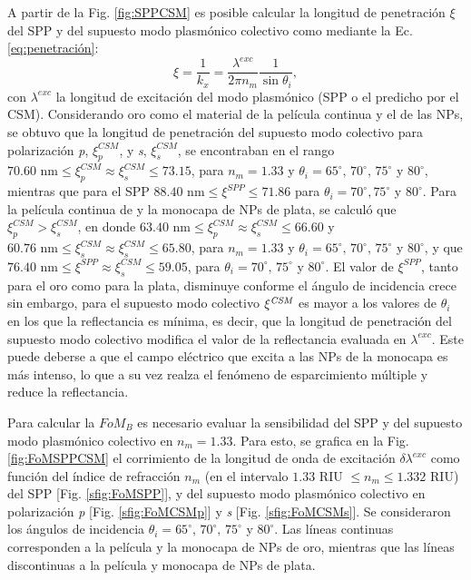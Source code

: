 A partir de la  Fig. \ref{fig:SPPCSM} es posible calcular la longitud de penetración $\xi$ del SPP y del supuesto modo plasmónico colectivo como mediante la Ec. \eqref{eq:penetración}:
%
\begin{equation*}
\xi=\frac{1}{k_x}= \frac{\lambda^{exc}}{2\pi n_m}\frac{1}{\sin\theta_i} ,
\end{equation*}
%
con $\lambda^{exc}$ la longitud de excitación del modo plasmónico (SPP o el predicho por el CSM). Considerando oro como el material de la película continua y el de las NPs, se obtuvo que la longitud de penetración del supuesto modo colectivo para polarización \emph{p}, $\xi^{\textit{CSM}}_p$, y \emph{s}, $\xi^{\textit{CSM}}_s$, se encontraban en el rango $70.60\mbox{ nm}\leq \xi^{\textit{CSM}}_p\approx\xi^{\textit{CSM}}_s\leq 73.15$, para $n_m=1.33$ y $\theta_i=65^\circ,\, 70^\circ,\, 75^\circ$ y $80^\circ$, mientras que para el SPP $88.40\mbox{ nm}\leq \xi^{\textit{SPP}}\leq 71.86$ para $\theta_i= 70^\circ, 75^\circ$ y $80^\circ$. Para la película continua de  y la monocapa de NPs de plata, se calculó que $\xi^{\textit{CSM}}_p>\xi^{\textit{CSM}}_s$, en donde $63.40\mbox{ nm}\leq \xi^{\textit{CSM}}_p\approx\xi^{\textit{CSM}}_s \leq 66.60$ y $60.76\mbox{ nm}\leq \xi^{\textit{CSM}}_s\approx\xi^{\textit{CSM}}_s\leq 65.80$, para $n_m=1.33$ y $\theta_i=65^\circ,\, 70^\circ,\, 75^\circ$ y $80^\circ$, y que $76.40\mbox{ nm}\leq \xi^{\textit{SPP}}\approx\xi^{\textit{CSM}}_s\leq 59.05$, para $\theta_i= 70^\circ,\, 75^\circ$ y $80^\circ$. El valor de $\xi^{\textit{SPP}}$, tanto para el oro como para la plata, disminuye conforme el ángulo de incidencia crece sin embargo, para el supuesto modo colectivo $\xi^{\textit{\textit{CSM}}}$ es mayor a los valores de $\theta_i$ en los que la reflectancia es mínima, es decir, que la longitud de penetración del supuesto modo colectivo modifica el valor de la reflectancia evaluada en $\lambda^{exc}$. Este puede deberse a que el campo eléctrico que excita a las NPs de la monocapa es más intenso, lo que a su vez realza el fenómeno de esparcimiento múltiple y reduce la reflectancia.

Para calcular la $\textit{FoM}_B$ es necesario evaluar la sensibilidad del SPP y del supuesto modo plasmónico  colectivo en $n_m=1.33$. Para esto, se grafica en la Fig. \ref{fig:FoMSPPCSM} el corrimiento de la longitud de onda de excitación $\delta\lambda^{exc}$ como función del índice de refracción $n_m$ (en el intervalo $1.33$ RIU $\leq n_m\leq 1.332$ RIU)  del SPP [Fig. \ref{sfig:FoMSPP}], y del supuesto modo  plasmónico colectivo en polarización \emph{p} [Fig. \ref{sfig:FoMCSMp}] y \emph{s} [Fig. \ref{sfig:FoMCSMs}]. Se consideraron los ángulos de incidencia $\theta_i=65^\circ,\, 70^\circ,\, 75^\circ$ y $80^\circ$. Las líneas continuas corresponden a la película y la monocapa de NPs de oro, mientras que las líneas discontinuas a la película y monocapa de NPs de plata. 


